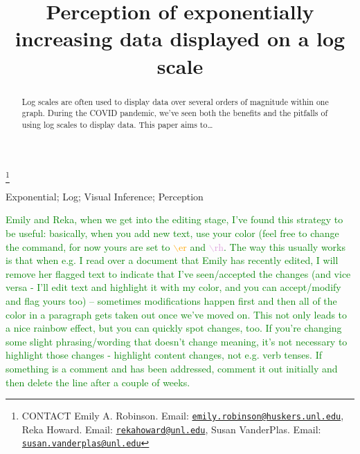 \documentclass[]{interact}
\theoremstyle{plain}%
\theoremstyle{definition}
\theoremstyle{remark}
\begin{document}

\title{Perception of exponentially increasing data displayed on a log
scale}


\author{
}

\thanks{CONTACT Emily A.
Robinson. Email: \href{mailto:emily.robinson@huskers.unl.edu}{\nolinkurl{emily.robinson@huskers.unl.edu}}, Reka
Howard. Email: \href{mailto:rekahoward@unl.edu}{\nolinkurl{rekahoward@unl.edu}}, Susan
VanderPlas. Email: \href{mailto:susan.vanderplas@unl.edu}{\nolinkurl{susan.vanderplas@unl.edu}}}

\maketitle

\begin{abstract}
Log scales are often used to display data over several orders of
magnitude within one graph. During the COVID pandemic, we've seen both
the benefits and the pitfalls of using log scales to display data. This
paper aims to\ldots{}
\end{abstract}

\begin{keywords}
Exponential; Log; Visual Inference; Perception
\end{keywords}

\textcolor{Green}{Emily and Reka, when we get into the editing stage, I've found this strategy to be useful: basically, when you add new text, use your color (feel free to change the command, for now yours are set to \textcolor{Orange}{$\backslash$er} and \textcolor{Plum}{$\backslash$rh}.}
\textcolor{Green}{The way this usually works is that when e.g. I read over a document that Emily has recently edited, I will remove her flagged text to indicate that I've seen/accepted the changes (and vice versa - I'll edit text and highlight it with my color, and you can accept/modify and flag yours too) -- sometimes modifications happen first and then all of the color in a paragraph gets taken out once we've moved on.}
\textcolor{Green}{This not only leads to a nice rainbow effect, but you can quickly spot changes, too. If you're changing some slight phrasing/wording that doesn't change meaning, it's not necessary to highlight those changes - highlight content changes, not e.g. verb tenses.}
\textcolor{Green}{If something is a comment and has been addressed, comment it out initially and then delete the line after a couple of weeks.}
\end{document}
